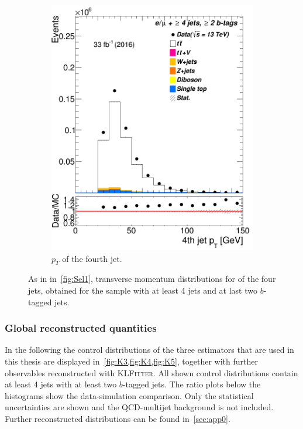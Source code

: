 \begin{figure} [t]
\begin{subfigure}{0.25\textwidth}
		\includegraphics[width=\linewidth]{ControlPlots_emujets_2016_4incl_2incl/jet3_pt_emujets_2016.png}
		\caption{$p_T$ of the fourth jet.} \label{fig:Sec28}
	\end{subfigure}
	
	
	\caption{As in in~\cref{fig:Sel1}, transverse momentum distributions  for of the four jets, obtained for the sample with at least 4 jets and at last two $b$-tagged jets.}
	\label{fig:Sel4}
\end{figure}



\subsubsection{Global reconstructed quantities}


In the following the control distributions of the three estimators that are used in this thesis are displayed in~\cref{fig:K3,fig:K4,fig:K5}, together with further observables  reconstructed with \textsc{KLFitter}. 
All shown control distributions contain at least 4 jets with at least two $b$-tagged jets.  The ratio plots below the histograms show the data-simulation comparison. Only the statistical uncertainties are shown and the QCD-multijet background is not included. Further reconstructed distributions can be found in~\cref{sec:app0}. 



